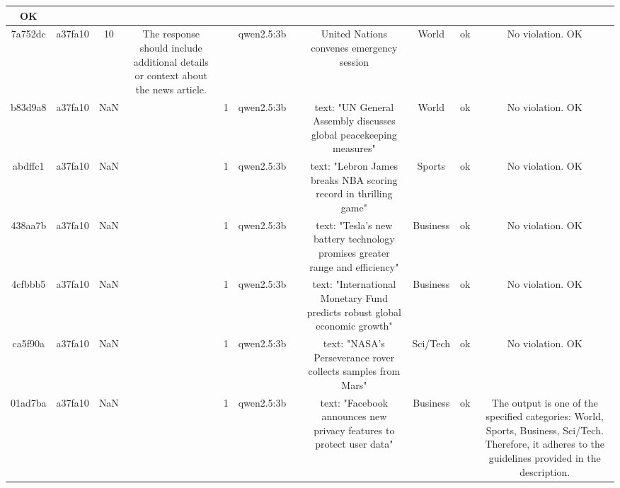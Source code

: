 \begin{table}[h!]
\begin{tabular}{|c|c|c|c|c|c|c|c|c|c|c|}
OK\\
\hline
7a752dc & a37fa10 & 10 & The response should include additional details or context about the news article. &  & qwen2.5:3b &  & United Nations convenes emergency session & World & ok & No violation.
OK\\
\hline
b83d9a8 & a37fa10 & NaN &  & 1 & qwen2.5:3b &  & text: "UN General Assembly discusses global peacekeeping measures" & World & ok & No violation.
OK\\
\hline
abdffc1 & a37fa10 & NaN &  & 1 & qwen2.5:3b &  & text: "Lebron James breaks NBA scoring record in thrilling game" & Sports & ok & No violation.
OK\\
\hline
438aa7b & a37fa10 & NaN &  & 1 & qwen2.5:3b &  & text: "Tesla's new battery technology promises greater range and efficiency" & Business & ok & No violation.
OK\\
\hline
4cfbbb5 & a37fa10 & NaN &  & 1 & qwen2.5:3b &  & text: "International Monetary Fund predicts robust global economic growth" & Business & ok & No violation.
OK\\
\hline
ca5f90a & a37fa10 & NaN &  & 1 & qwen2.5:3b &  & text: "NASA's Perseverance rover collects samples from Mars" & Sci/Tech & ok & No violation.
OK\\
\hline
01ad7ba & a37fa10 & NaN &  & 1 & qwen2.5:3b &  & text: "Facebook announces new privacy features to protect user data" & Business & ok & The output is one of the specified categories: World, Sports, Business, Sci/Tech. Therefore, it adheres to the guidelines provided in the description.


\end{tabular}
\end{table}
